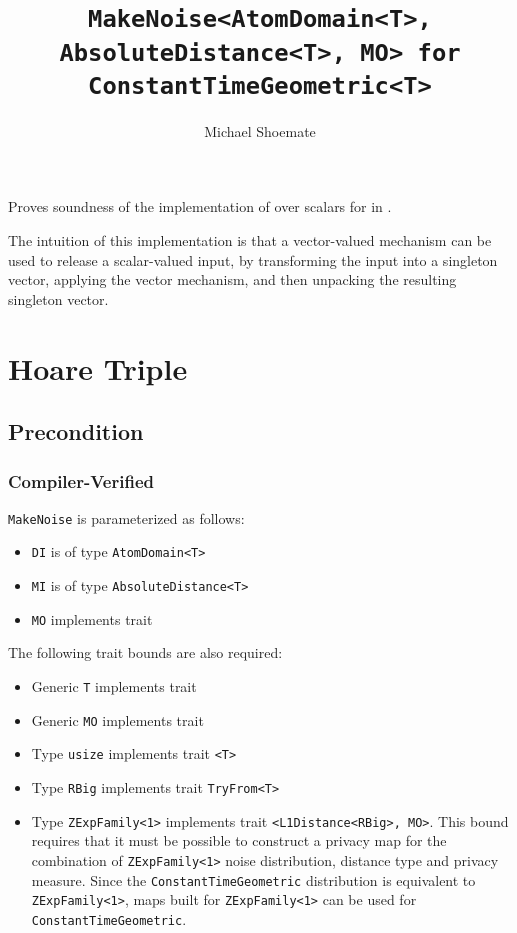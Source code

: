 \documentclass{article}
\title{\texttt{MakeNoise<AtomDomain<T>, AbsoluteDistance<T>, MO> for ConstantTimeGeometric<T>}}
\author{Michael Shoemate}
\date{}
\begin{document}
\maketitle

\contrib
Proves soundness of the implementation of  over scalars
for  in .

The intuition of this implementation is that a vector-valued mechanism can be used to release a scalar-valued input,
by transforming the input into a singleton vector, 
applying the vector mechanism, and then unpacking the resulting singleton vector.

\section{Hoare Triple}
\subsection*{Precondition}
\subsubsection*{Compiler-Verified}

\texttt{MakeNoise} is parameterized as follows:
\begin{itemize}
    \item \texttt{DI} is of type \texttt{AtomDomain<T>}
    \item \texttt{MI} is of type \texttt{AbsoluteDistance<T>}
    \item \texttt{MO} implements trait 
\end{itemize}

The following trait bounds are also required:
\begin{itemize}
    \item Generic \texttt{T} implements trait 
    \item Generic \texttt{MO} implements trait 
    \item Type \texttt{usize} implements trait \texttt{<T>}
    \item Type \texttt{RBig} implements trait \texttt{TryFrom<T>}
    \item Type \texttt{ZExpFamily<1>} implements trait \texttt{<L1Distance<RBig>, MO>}.
        This bound requires that it must be possible to construct a privacy map for the combination of \texttt{ZExpFamily<1>} noise distribution, distance type and privacy measure.
        Since the \texttt{ConstantTimeGeometric} distribution is equivalent to \texttt{ZExpFamily<1>},
        maps built for \texttt{ZExpFamily<1>} can be used for \texttt{ConstantTimeGeometric}.
\end{itemize}
\end{document}
